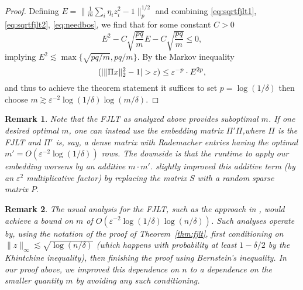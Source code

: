 \documentclass[12pt]{article}
\let\Pr\relax
\DeclareMathOperator*{\Pr}{\mathbb{P}}
\newcommand{\eps}{\varepsilon}
\newtheorem{remark}{Remark}
\newcommand{\RemarkName}[1]{\label{rem:#1}}
\newcommand{\Theorem}[1]{Theorem~\ref{thm:#1}}
\newcommand{\Eqsub}[1]{\eqref{eq:#1}}
\begin{document}
\begin{proof}
Defining $E = \|\frac 1m\sum_i \eta_i z_i^2 - 1\|_p^{1/2}$ and combining \Eqsub{sqrtfjlt1}, \Eqsub{sqrtfjlt2}, \Eqsub{needbos}, we find that for some constant $C>0$
$$
E^2 - C\sqrt{\frac{pq}m}E - C\sqrt{\frac{pq}m} \le 0 ,
$$
implying $E^2\lesssim \max\{\sqrt{pq/m}, pq/m\}$. By the Markov inequality
$$
\Pr(|\|\Pi x\|_2^2 - 1| > \eps) \le \eps^{-p}\cdot E^{2p} ,
$$
and thus to achieve the theorem statement it suffices to set $p = \log(1/\delta)$ then choose $m\gtrsim \eps^{-2}\log(1/\delta)\log(m/\delta)$.
\end{proof}

\begin{remark}\RemarkName{useP}
\textup{
Note that the FJLT as analyzed above provides suboptimal $m$. If one desired optimal $m$, one can instead use the embedding matrix $\Pi' \Pi$,where $\Pi$ is the FJLT and $\Pi'$ is, say, a dense matrix with Rademacher entries having the optimal $m' = O(\eps^{-2}\log(1/\delta))$ rows. The downside is that the runtime to apply our embedding worsens by an additive $m\cdot m'$. \cite{AilonC09} slightly improved this additive term (by an $\eps^2$ multiplicative factor) by replacing the matrix $S$ with a random sparse matrix $P$.
}
\end{remark}

\begin{remark}
\textup{
The usual analysis for the FJLT, such as the approach in \cite{AilonC09}, would achieve a bound on $m$ of $O(\eps^{-2}\log(1/\delta)\log(n/\delta))$. Such analyses operate by, using the notation of the proof of \Theorem{fjlt}, first conditioning on $\|z\|_\infty \lesssim \sqrt{\log(n/\delta)}$ (which happens with probability at least $1-\delta/2$ by the Khintchine inequality), then finishing the proof using Bernstein's inequality. In our proof above, we improved this dependence on $n$ to a dependence on the smaller quantity $m$ by avoiding any such conditioning.
}
\end{remark}




\end{document}
